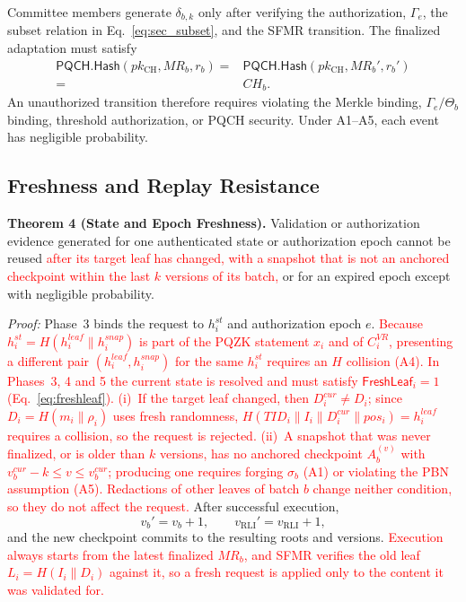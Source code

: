 \documentclass[lettersize,journal]{IEEEtran}
\begin{document}
Committee members generate $\delta_{b,k}$ only after verifying the
authorization, $\Gamma_e$, the subset relation in
Eq.~\eqref{eq:sec_subset}, and the SFMR transition. The finalized
adaptation must satisfy
\begin{equation}
\begin{split}
\mathsf{PQCH.Hash}(pk_{\mathrm{CH}},MR_b,r_b)
={}&
\mathsf{PQCH.Hash}(pk_{\mathrm{CH}},MR_b',r_b')\\
={}&CH_b.
\end{split}
\label{eq:sec_pqch_continuity}
\end{equation}
An unauthorized transition therefore requires violating the Merkle
binding, $\Gamma_e/\Theta_b$ binding, threshold authorization, or
PQCH security. Under A1--A5, each event has negligible probability.

\subsection{Freshness and Replay Resistance}

\textbf{Theorem 4 (State and Epoch Freshness).}
Validation or authorization evidence generated for one authenticated
state or authorization epoch cannot be reused \textcolor{red}{after its
target leaf has changed, with a snapshot that is not an anchored
checkpoint within the last $k$ versions of its batch,} or for an expired
epoch except with negligible probability.

\emph{Proof:}
Phase~3 binds the request to $h_i^{st}$ and authorization epoch $e$.
\textcolor{red}{Because $h_i^{st}=H(h_i^{leaf}\parallel h_i^{snap})$ is
part of the PQZK statement $x_i$ and of $C_i^{VR}$, presenting a different
pair $(h_i^{leaf},h_i^{snap})$ for the same $h_i^{st}$ requires an $H$
collision (A4). In Phases~3, 4 and 5 the current state is resolved and
must satisfy $\mathsf{FreshLeaf}_i=1$ (Eq.~\eqref{eq:freshleaf}).
(i)~If the target leaf changed, then $D_i^{cur}\neq D_i$; since
$D_i=H(m_i\parallel\rho_i)$ uses fresh randomness,
$H(TID_i\parallel I_i\parallel D_i^{cur}\parallel pos_i)=h_i^{leaf}$
requires a collision, so the request is rejected. (ii)~A snapshot that
was never finalized, or is older than $k$ versions, has no anchored
checkpoint $A_b^{(v)}$ with $v_b^{cur}-k\le v\le v_b^{cur}$; producing one
requires forging $\sigma_b$ (A1) or violating the PBN assumption (A5).
Redactions of other leaves of batch $b$ change neither condition, so they
do not affect the request.}
After successful execution,
\begin{equation}
v_b'=v_b+1,
\qquad
v_{\mathrm{RLI}}'=v_{\mathrm{RLI}}+1,
\end{equation}
and the new checkpoint commits to the resulting roots and versions.
\textcolor{red}{Execution always starts from the latest finalized $MR_b$,
and SFMR verifies the old leaf $L_i=H(I_i\parallel D_i)$ against it, so a
fresh request is applied only to the content it was validated for.}
\end{document}
